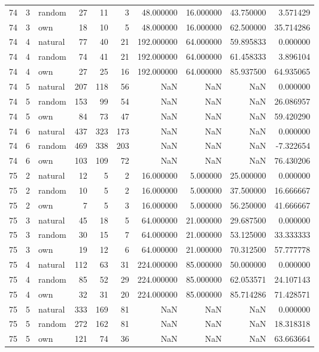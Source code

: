 \begin{table}[htbp]
\begin{tabular}{rrlrrrrrrr}
74 & 3 & random & 27 & 11 & 3 & 48.000000 & 16.000000 & 43.750000 & 3.571429 \\
74 & 3 & own & 18 & 10 & 5 & 48.000000 & 16.000000 & 62.500000 & 35.714286 \\
74 & 4 & natural & 77 & 40 & 21 & 192.000000 & 64.000000 & 59.895833 & 0.000000 \\
74 & 4 & random & 74 & 41 & 21 & 192.000000 & 64.000000 & 61.458333 & 3.896104 \\
74 & 4 & own & 27 & 25 & 16 & 192.000000 & 64.000000 & 85.937500 & 64.935065 \\
74 & 5 & natural & 207 & 118 & 56 & NaN & NaN & NaN & 0.000000 \\
74 & 5 & random & 153 & 99 & 54 & NaN & NaN & NaN & 26.086957 \\
74 & 5 & own & 84 & 73 & 47 & NaN & NaN & NaN & 59.420290 \\
74 & 6 & natural & 437 & 323 & 173 & NaN & NaN & NaN & 0.000000 \\
74 & 6 & random & 469 & 338 & 203 & NaN & NaN & NaN & -7.322654 \\
74 & 6 & own & 103 & 109 & 72 & NaN & NaN & NaN & 76.430206 \\
75 & 2 & natural & 12 & 5 & 2 & 16.000000 & 5.000000 & 25.000000 & 0.000000 \\
75 & 2 & random & 10 & 5 & 2 & 16.000000 & 5.000000 & 37.500000 & 16.666667 \\
75 & 2 & own & 7 & 5 & 3 & 16.000000 & 5.000000 & 56.250000 & 41.666667 \\
75 & 3 & natural & 45 & 18 & 5 & 64.000000 & 21.000000 & 29.687500 & 0.000000 \\
75 & 3 & random & 30 & 15 & 7 & 64.000000 & 21.000000 & 53.125000 & 33.333333 \\
75 & 3 & own & 19 & 12 & 6 & 64.000000 & 21.000000 & 70.312500 & 57.777778 \\
75 & 4 & natural & 112 & 63 & 31 & 224.000000 & 85.000000 & 50.000000 & 0.000000 \\
75 & 4 & random & 85 & 52 & 29 & 224.000000 & 85.000000 & 62.053571 & 24.107143 \\
75 & 4 & own & 32 & 31 & 20 & 224.000000 & 85.000000 & 85.714286 & 71.428571 \\
75 & 5 & natural & 333 & 169 & 81 & NaN & NaN & NaN & 0.000000 \\
75 & 5 & random & 272 & 162 & 81 & NaN & NaN & NaN & 18.318318 \\
75 & 5 & own & 121 & 74 & 36 & NaN & NaN & NaN & 63.663664 \\

\end{tabular}
\end{table}
